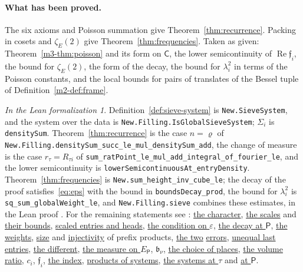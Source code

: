 \documentclass[reqno]{amsart}
\theoremstyle{definition}
\theoremstyle{plain}
\theoremstyle{remark}
\newtheorem*{leanremark}{In the Lean formalization}
\newcommand{\ff}{\mathfrak{f}}
\newcommand{\Pf}{\mathsf{P}}
\newcommand{\EP}{E_{\mathsf P}}
\newcommand{\Cs}{\mathsf{C}}
\newcommand{\tl}[1]{\texttt{#1}}
\newcommand{\gk}[3]{\href{https://github.com/lsernau/grh-lean/blob/72fead1/grh/src/#1.lean\#L#2}{#3}}
\newcommand{\gl}[1]{\gk{New/Spanning/#1}}
\newcommand{\gs}{\gl{MainTerm/GlobalSieve}}
\begin{document}
\paragraph{What has been proved.}  The six axioms and Poisson summation give Theorem~\ref{thm:recurrence}.  Packing in cosets and \(\zeta_E(2)\) give Theorem~\ref{thm:frequencies}.  Taken as given: Theorem~\ref{m3-thm:poisson} and its form on \(\Cs\), the lower semicontinuity of \(\operatorname{Re}\ff_i\), the bound for \(\zeta_E(2)\), the form of the decay, the bound for \(\lambda_i^2\) in terms of the Poisson constants, and the local bounds for pairs of translates of the Bessel tuple of Definition~\ref{m2-def:frame}.

\begin{leanremark}
{\raggedright Definition~\ref{def:sieve-system} is \tl{New.SieveSystem}, and the system over the data is \tl{New.Filling.IsGlobalSieveSystem}; \(\Sigma_i\) is \tl{densitySum}.  Theorem~\ref{thm:recurrence} is the case \(n=\varrho\) of \tl{New.Filling.densitySum\_succ\_le\_mul\_densitySum\_add}, the change of measure is the case \(r_\tau=R_{\tau i}\) of \tl{sum\_ratPoint\_le\_mul\_add\_integral\_of\_fourier\_le}, and the lower semicontinuity is \tl{lowerSemicontinuousAt\_entryDensity}.  Theorem~\ref{thm:frequencies} is \tl{New.sum\_height\_inv\_cube\_le}; the decay of the proof satisfies~\eqref{eq:eps} with the bound in \tl{boundsDecay\_prod}, the bound for \(\lambda_i^2\) is \tl{sq\_sum\_globalWeight\_le}, and \tl{New.Filling.sieve} combines these estimates, in the Lean proof \cite{GL}.  For the remaining statements see \cite{GL}: \gs{93}{the character}, \gl{Unfolding/Setup}{250}{the scales} and \gl{Unfolding/Setup}{509}{their bounds}, \gs{521}{scaled entries and heads}, \gs{514}{the condition on \(\varepsilon\)}, \gs{102}{the decay at \(\Pf\)}, \gs{927}{the weights}, \gs{974}{size} and \gs{877}{injectivity} of prefix products, \gs{693}{the two} \gs{620}{errors}, \gs{653}{unequal last entries}, \gl{Unfolding/Setup}{109}{the different}, \gk{Lib/Adelic/Adeles/SemilocalProducts}{255}{the measure on \(\EP\)}, \gl{MainTerm/Frequencies}{28}{\(\mathfrak b_\nu\)}, \gl{MainTerm/EnergyEstimate}{641}{the choice of places}, \gl{Bessel/Basic}{849}{the volume ratio}, \gs{531}{\(c_i\)}, \gs{540}{\(\ff_i\)}, \gk{Lib/Adelic/Adeles/SemilocalProducts}{329}{the index}, \gl{MainTerm/SieveSystem}{147}{products of systems}, \gl{Frames/RealBandLimits}{696}{the systems at \(\tau\)} and \gl{MainTerm/FiniteSieveSystem}{280}{at \(\Pf\)}.\par}
\end{leanremark}
\end{document}
